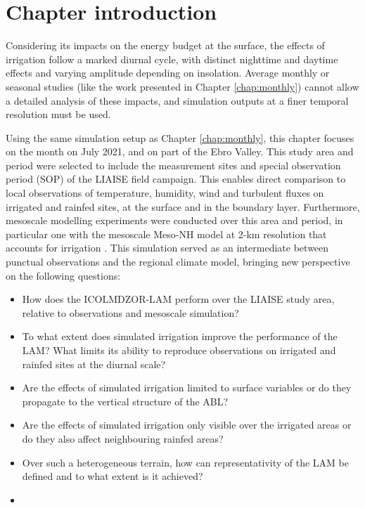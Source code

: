 \section{Chapter introduction}

Considering its impacts on the energy budget at the surface, the effects of irrigation follow a marked diurnal cycle, with distinct nighttime and daytime effects and varying amplitude depending on insolation. 
Average monthly or seasonal studies (like the work presented in Chapter \ref{chap:monthly}) cannot allow a detailed analysis of these impacts, and simulation outputs at a finer temporal resolution must be used.

Using the same simulation setup as Chapter \ref{chap:monthly}, this chapter focuses on the month on July 2021, and on part of the Ebro Valley. This study area and period were selected to include the measurement sites and special observation period (SOP) of the LIAISE field campaign. This enables direct comparison to local observations of temperature, humidity, wind and turbulent fluxes on irrigated and rainfed sites, at the surface and in the boundary layer. Furthermore, mesoscale modelling experiments were conducted over this area and period, in particular one with the mesoscale Meso-NH model at 2-km resolution that accounts for irrigation \citep{lunel_irrigation_2024}. This simulation served as an intermediate between punctual observations and the regional climate model, bringing new perspective on the following questions:

\begin{itemize}
    \item How does the ICOLMDZOR-LAM perform over the LIAISE study area, relative to observations and mesoscale simulation?
    \item To what extent does simulated irrigation improve the performance of the LAM? What limits its ability to reproduce observations on irrigated and rainfed sites at the diurnal scale?
    \item Are the effects of simulated irrigation limited to surface variables or do they propagate to the vertical structure of the ABL? 
    \item Are the effects of simulated irrigation only visible over the irrigated areas or do they also affect neighbouring rainfed areas?
    \item Over such a heterogeneous terrain, how can representativity of the LAM be defined and to what extent is it achieved?
    \item %
\end{itemize}

